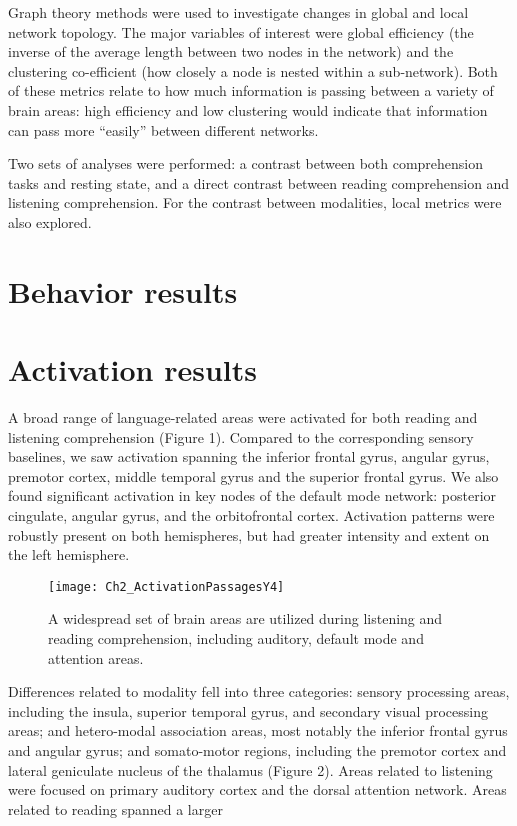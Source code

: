 Graph theory methods were used to investigate changes in global and local network topology. The major variables of interest were global efficiency (the inverse of the average length between two nodes in the network) and the clustering co-efficient (how closely a node is nested within a sub-network). Both of these metrics relate to how much information is passing between a variety of brain areas: high efficiency and low clustering would indicate that information can pass more “easily” between different networks. 

Two sets of analyses were performed: a contrast between both comprehension tasks and resting state, and a direct contrast between reading comprehension and listening comprehension. For the contrast between modalities, local metrics were also explored.

\section{Behavior results}


\section{Activation results}

A broad range of language-related areas were activated for both reading and listening comprehension (Figure 1). Compared to the corresponding sensory baselines, we saw activation spanning the inferior frontal gyrus, angular gyrus, premotor cortex, middle temporal gyrus and the superior frontal gyrus. We also found significant activation in key nodes of the default mode network: posterior cingulate, angular gyrus, and the orbitofrontal cortex. Activation patterns were robustly present on both hemispheres, but had greater intensity and extent on the left hemisphere. 

\begin{figure}[tp]
\centering
\texttt{[image: Ch2\_ActivationPassagesY4]}
    \caption[Language comprehension spans many brain areas.]{A widespread set of brain areas are utilized during listening and reading comprehension, including auditory, default mode and attention areas.}
\label{fig:ch2_passages}
\end{figure}

Differences related to modality fell into three categories: sensory processing areas, including the insula, superior temporal gyrus, and secondary visual processing areas; and hetero-modal association areas, most notably the inferior frontal gyrus and angular gyrus; and somato-motor regions, including the premotor cortex and lateral geniculate nucleus of the thalamus (Figure 2). Areas related to listening were focused on primary auditory cortex and the dorsal attention network. Areas related to reading spanned a larger 


